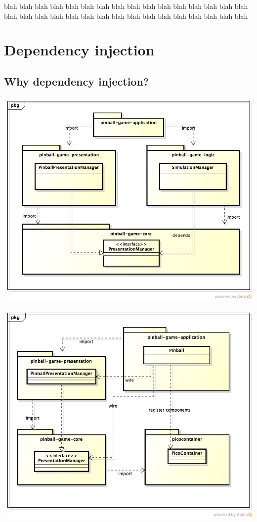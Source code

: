 \documentclass[fontsize=12pt,
               paper=a4,
               twoside=false,
               parskip=half,
               ]{scrartcl}
\begin{document}
blah blah blah blah blah blah blah blah blah blah blah blah blah blah blah blah 
blah blah blah blah blah blah blah blah blah blah blah blah blah blah blah blah

\section{Dependency injection}
\subsection{Why dependency injection?}
\includegraphics[width=15.5cm]{./img/dependency-injection1.png}

\includegraphics[width=15.5cm]{./img/dependency-injection2.png}
\end{document}
